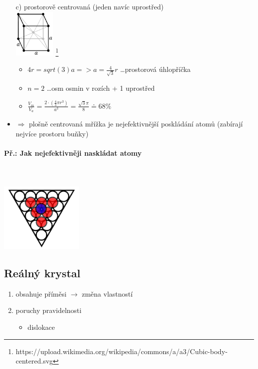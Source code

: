 \begin{itemize}
\item[c)] prostorově centrovaná (jeden navíc uprostřed) \\
\includegraphics[width=2cm]{pictures/Cubic-body-centered.png} \footnote{https://upload.wikimedia.org/wikipedia/commons/a/a3/Cubic-body-centered.svg}
\begin{itemize}
\item $4r = sqrt(3)a => a = \frac{4}{\sqrt{3}}r$ \ldots prostorová úhlopříčka
\item $n = 2$ \ldots osm osmin v rozích + 1 uprostřed
\item $\frac{V_m}{V_a} = \frac{2 \cdot (\frac{4}{3}\pi r^3)}{a^3} = \frac{\sqrt{3}\pi}{8} \doteq  68\%$
\end{itemize}
\item $\Rightarrow$ plošně centrovaná mřížka je nejefektivnější poskládání atomů (zabírají nejvíce prostoru buňky)
\end{itemize}

\paragraph{Př.: Jak nejefektivněji naskládat atomy}\mbox{} \\ \mbox{} \\
\includegraphics[width=0.3\textwidth]{pictures/004.png}

\subsection{Reálný krystal}
\begin{enumerate}
\item obsahuje příměsi $\rightarrow$ změna vlastností
\item poruchy pravidelnosti
\begin{itemize}
\item dislokace
\end{itemize}
\end{enumerate}

